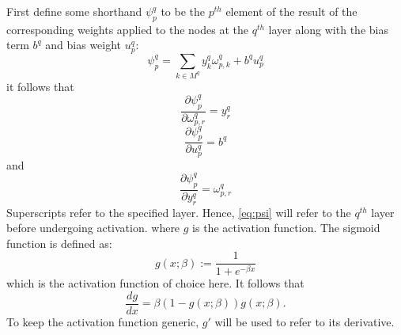 \documentclass{article}
\begin{document}
First define some shorthand $\psi_p^q$ to be the $p^{th}$ element of the result of the corresponding weights applied to the nodes at the $q^{th}$ layer along with the bias term $b^q$ and bias weight $u_p^q$:
%
\begin{equation} \label{eq:psi}
\psi_p^q = \sum_{k \in M^q} y_k^q \omega_{p,k}^q + b^q u_p^q
\end{equation}
%
it follows that
%
\begin{equation} \label{eq:dpsi_w}
\frac{\partial \psi_p^q}{\partial \omega_{p,r}^q} =
y_r^q
\end{equation}
%
\begin{equation} \label{eq:dpsi_u}
\frac{\partial \psi_p^q}{\partial u_p^q} =
b^q
\end{equation}
%
and
%
\begin{equation} \label{eq:dpsi_y}
\frac{\partial \psi_p^q}{\partial y_r^q} =
\omega_{p,r}^q
\end{equation}
%
%
Superscripts refer to the specified layer.
Hence, \eqref{eq:psi} will refer to the $q^{th}$ layer before undergoing activation.
%
where $g$ is the activation function. The sigmoid function is defined as:
%
\begin{equation} \label{eq:g}
g(x;\beta) := \frac{1}{1 + e^{-\beta x}}
\end{equation}
%
which is the activation function of choice here.
It follows that
%
\begin{equation} \label{eq:gp}
\frac{d g}{d x} = \beta \left( 1 - g(x;\beta) \right) g(x; \beta).
\end{equation}
%
To keep the activation function generic, $g'$ will be used to refer to its derivative.
\end{document}
